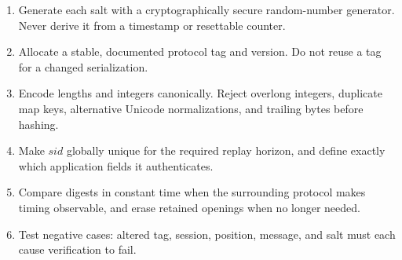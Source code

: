 \begin{enumerate}
  \item Generate each salt with a cryptographically secure random-number
        generator.  Never derive it from a timestamp or resettable counter.
  \item Allocate a stable, documented protocol tag and version.  Do not reuse
        a tag for a changed serialization.
  \item Encode lengths and integers canonically.  Reject overlong integers,
        duplicate map keys, alternative Unicode normalizations, and trailing
        bytes before hashing.
  \item Make $sid$ globally unique for the required replay horizon, and define
        exactly which application fields it authenticates.
  \item Compare digests in constant time when the surrounding protocol makes
        timing observable, and erase retained openings when no longer needed.
  \item Test negative cases: altered tag, session, position, message, and salt
        must each cause verification to fail.
\end{enumerate}
